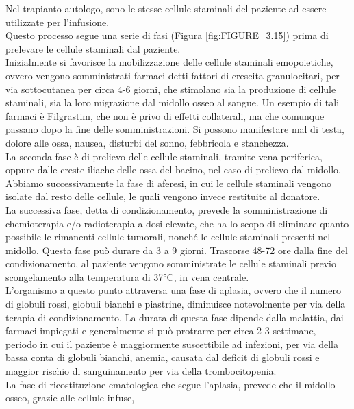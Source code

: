 Nel trapianto autologo, sono le stesse cellule staminali del paziente ad essere utilizzate per l’infusione.\\ 
Questo  processo segue una serie di fasi (Figura \ref{fig:FIGURE_3.15}) prima di prelevare le cellule staminali dal 
paziente.\\ Inizialmente si favorisce  la mobilizzazione delle cellule staminali emopoietiche, 
ovvero vengono somministrati farmaci detti fattori di crescita granulocitari, per via sottocutanea per circa 4-6 giorni, 
che stimolano sia la produzione di cellule staminali, sia la loro migrazione dal midollo osseo al sangue\cite{TRAPIANTO}.
Un esempio di tali farmaci è Filgrastim, che non è privo di effetti collaterali, ma che comunque passano dopo la fine 
delle somministrazioni. Si possono manifestare mal di testa, dolore alle ossa, nausea, disturbi del sonno, 
febbricola e stanchezza\cite{STEMCELLS}.\\
La seconda fase è di prelievo delle cellule staminali, tramite vena periferica, oppure dalle creste iliache delle 
ossa del bacino, nel caso di prelievo dal midollo.\\ 
Abbiamo successivamente la fase di aferesi, in cui le cellule staminali vengono isolate dal resto delle cellule, 
le quali vengono invece restituite al donatore.\\ 
La successiva fase, detta di condizionamento, prevede la somministrazione di chemioterapia e/o radioterapia a dosi 
elevate, che ha lo scopo di eliminare quanto possibile le rimanenti cellule tumorali, nonché le cellule staminali 
presenti nel midollo. Questa fase può durare da 3 a 9 giorni. Trascorse 48-72 ore dalla fine del condizionamento, 
al paziente vengono somministrate le cellule staminali previo scongelamento alla temperatura di 37°C, in vena centrale\cite{TRAPIANTO}.\\
L’organismo a questo punto attraversa una fase di aplasia, ovvero che il numero di globuli rossi, globuli bianchi e 
piastrine, diminuisce notevolmente per via della terapia di condizionamento. La durata di questa fase dipende 
dalla malattia, dai farmaci impiegati e generalmente si può protrarre per circa 2-3 settimane\cite{TRAPIANTO}, 
periodo in cui il paziente è maggiormente suscettibile ad infezioni, per via della bassa conta di globuli bianchi, 
anemia, causata dal deficit di globuli rossi e maggior rischio di sanguinamento per via della trombocitopenia\cite{LLSBLOOD}.\\
La fase di ricostituzione ematologica che segue l’aplasia, prevede che il midollo osseo, grazie alle cellule infuse, 
